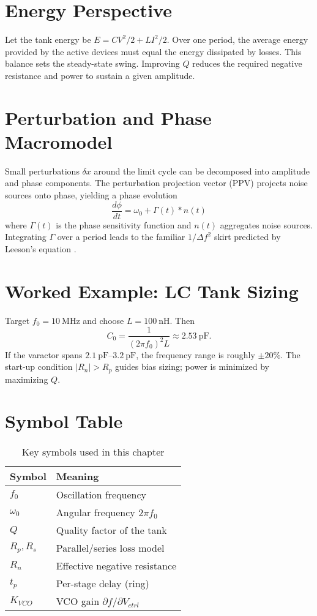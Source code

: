 \section{Energy Perspective}
Let the tank energy be \(E = C V^2/2 + L I^2/2\). Over one period, the average energy provided by the active devices must equal the energy dissipated by losses. This balance sets the steady-state swing. Improving \(Q\) reduces the required negative resistance and power to sustain a given amplitude.

\section{Perturbation and Phase Macromodel}
Small perturbations \(\delta x\) around the limit cycle can be decomposed into amplitude and phase components. The perturbation projection vector (PPV) projects noise sources onto phase, yielding a phase evolution
\[
\frac{d\phi}{dt} = \omega_0 + \Gamma(t) * n(t)
\]
where \(\Gamma(t)\) is the phase sensitivity function and \(n(t)\) aggregates noise sources. Integrating \(\Gamma\) over a period leads to the familiar \(1/\Delta f^2\) skirt predicted by Leeson's equation \cite{leeson1966}.

\section{Worked Example: LC Tank Sizing}
Target \(f_0 = \SI{10}{\mega\hertz}\) and choose \(L = \SI{100}{\nano\henry}\). Then
\[
C_0 = \frac{1}{(2\pi f_0)^2 L} \approx \SI{2.53}{\pico\farad}.
\]
If the varactor spans \(\SIrange{2.1}{3.2}{\pico\farad}\), the frequency range is roughly \(\pm20\%\). The start-up condition \(|R_n|>R_p\) guides bias sizing; power is minimized by maximizing \(Q\).

\section{Symbol Table}
\begin{table}[H]
  \centering
  \begin{tabular}{ll}
    \toprule
    Symbol & Meaning \\
    \midrule
    \(f_0\) & Oscillation frequency \\
    \(\omega_0\) & Angular frequency \(2\pi f_0\) \\
    \(Q\) & Quality factor of the tank \\
    \(R_p, R_s\) & Parallel/series loss model \\
    \(R_n\) & Effective negative resistance \\
    \(t_p\) & Per-stage delay (ring) \\
    \(K_{VCO}\) & VCO gain \(\partial f/\partial V_{ctrl}\) \\
    \bottomrule
  \end{tabular}
  \caption{Key symbols used in this chapter}
\end{table}

